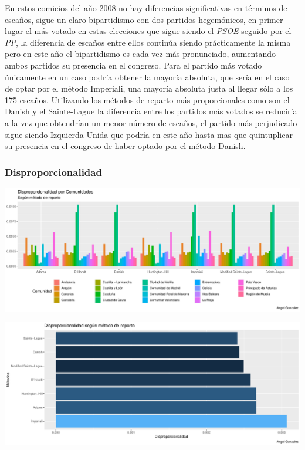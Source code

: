 \documentclass[12pt,a4paper,]{book}
\numberwithin{dummy}{section}
\theoremstyle{ocrenumbox}
\theoremstyle{blacknumex}
\theoremstyle{blacknumbox}
\theoremstyle{ocrenum}
\theoremstyle{ocrenum}
\begin{document}
En estos comicios del año 2008 no hay diferencias significativas en
términos de escaños, sigue un claro bipartidismo con dos partidos
hegemónicos, en primer lugar el más votado en estas elecciones que sigue
siendo el \emph{PSOE} seguido por el \emph{PP}, la diferencia de escaños
entre ellos continúa siendo prácticamente la misma pero en este año el
bipartidismo es cada vez más pronunciado, aumentando ambos partidos su
presencia en el congreso. Para el partido más votado únicamente en un
caso podría obtener la mayoría absoluta, que sería en el caso de optar
por el método Imperiali, una mayoría absoluta justa al llegar sólo a los
175 escaños. Utilizando los métodos de reparto más proporcionales como
son el Danish y el Sainte-Lague la diferencia entre los partidos más
votados se reduciría a la vez que obtendrían un menor número de escaños,
el partido más perjudicado sigue siendo Izquierda Unida que podría en
este año hasta mas que quintuplicar su presencia en el congreso de haber
optado por el método Danish.

\hypertarget{disproporcionalidad-9}{%
\subsubsection{Disproporcionalidad}\label{disproporcionalidad-9}}

\begin{center}\includegraphics[width=0.95\linewidth]{figurasR/unnamed-chunk-141-1} \end{center}

\begin{center}\includegraphics[width=0.95\linewidth]{figurasR/unnamed-chunk-141-2} \end{center}
\end{document}
